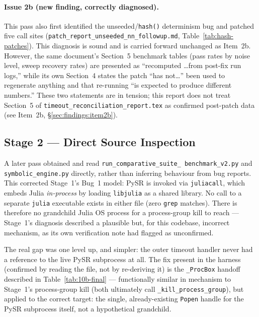 \documentclass[twoside,11pt]{article}
\begin{document}
\paragraph{Issue 2b (new finding, correctly diagnosed).} This pass also
first identified the unseeded/\texttt{hash()} determinism bug and
patched five call sites
(\texttt{patch\_report\_unseeded\_nn\_followup.md},
Table~\ref{tab:hash-patches}). This diagnosis is sound and is carried
forward unchanged as Item~2b. However, the same document's
Section~5 benchmark tables (pass rates by noise level, sweep recovery
rates) are presented as ``recomputed \ldots from post-fix run logs,''
while its own Section~4 states the patch ``has not\ldots'' been used to
regenerate anything and that re-running ``is expected to produce
different numbers.'' These two statements are in tension; this report
does not treat Section~5 of \texttt{timeout\_reconciliation\_report.tex}
as confirmed post-patch data (see Item~2b, \S\ref{sec:findings:item2b}).

\subsection{Stage 2 --- Direct Source Inspection}

A later pass obtained and read \texttt{run\_comparative\_suite\_
benchmark\_v2.py} and \texttt{symbolic\_engine.py} directly, rather than
inferring behaviour from bug reports. This corrected Stage~1's Bug~1
model: PySR is invoked via \texttt{juliacall}, which embeds Julia
\emph{in-process} by loading \texttt{libjulia} as a shared library. No
call to a separate \texttt{julia} executable exists in either file
(zero \texttt{grep} matches). There is therefore no grandchild Julia OS
process for a process-group kill to reach --- Stage~1's diagnosis
described a plausible but, for this codebase, incorrect mechanism, as
its own verification note had flagged as unconfirmed.

The real gap was one level up, and simpler: the outer timeout handler
never had a reference to the live PySR subprocess at all. The fix
present in the harness (confirmed by reading the file, not by
re-deriving it) is the \texttt{\_ProcBox} handoff described in
Table~\ref{tab:10b-final} --- functionally similar in mechanism to
Stage~1's process-group kill (both ultimately call
\texttt{\_kill\_process\_group}), but applied to the correct target: the
single, already-existing \texttt{Popen} handle for the PySR subprocess
itself, not a hypothetical grandchild.
\end{document}

